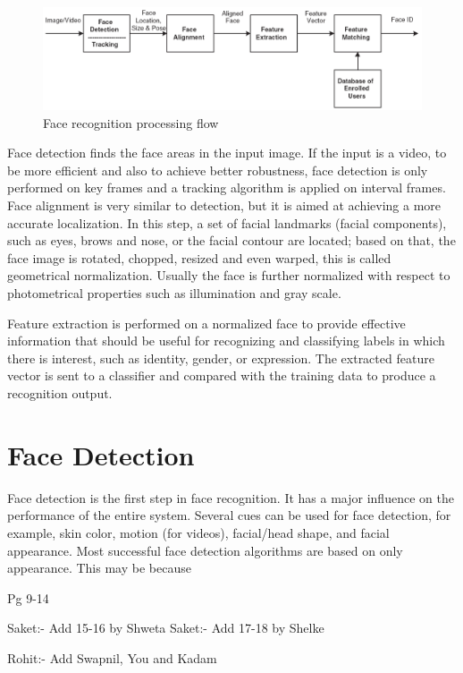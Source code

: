 \documentclass[12pt, twoside]{report}
\begin{document}
\begin{figure}[h]
    \centering
    \includegraphics[width=\textwidth]{img/processingFlow.png}
    \caption{Face recognition processing flow}
    \label{fig:processingFlow}
\end{figure}

Face detection finds the face areas in the input image. If the input is a video, to be more efficient and also to achieve better robustness, face detection is only performed on key frames and a tracking algorithm is applied on interval frames. Face alignment is very similar to detection, but it is aimed at achieving a more accurate localization. In this step, a set of facial landmarks (facial components), such as eyes, brows and nose, or the facial contour are located; based on that, the face image is rotated, chopped, resized and even warped, this is called geometrical normalization. Usually the face is further normalized with respect to photometrical properties such as illumination and gray scale.

Feature extraction is performed on a normalized face to provide effective information that should be useful for recognizing and classifying labels in which there is interest, such as identity, gender, or expression. The extracted feature vector is sent to a classifier and compared with the training data to produce a recognition output.

\section{Face Detection}
Face detection is the first step in face recognition. It has a major influence on the performance of the entire system. Several cues can be used for face detection, for example, skin color, motion (for videos), facial/head shape, and facial appearance. Most successful face detection algorithms are based on only appearance. This may be because 

Pg 9-14

Saket:- Add 15-16 by Shweta
Saket:- Add 17-18 by Shelke

Rohit:- Add Swapnil, You and Kadam
\end{document}
